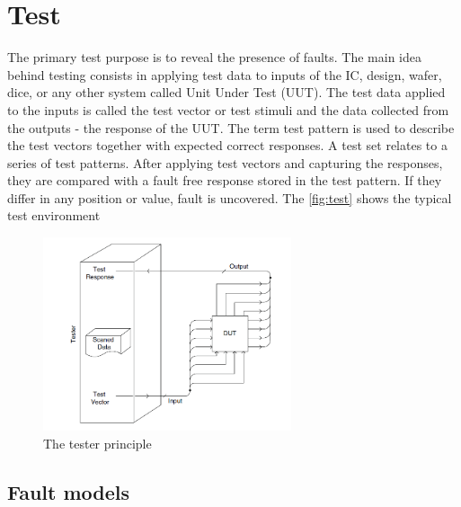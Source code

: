 \chapter{Test}
The primary test purpose is to reveal the presence of faults. The main idea behind testing consists in applying test data to inputs of the IC, design, wafer, dice, or any other system called Unit Under Test (UUT). The test data applied to the inputs is called the test vector or test stimuli and the data collected from the outputs - the response of the UUT. The term test pattern is used to describe the test vectors together with expected correct responses. A test set relates to a series of test patterns. After applying test vectors and capturing the responses, they are compared with a fault free response stored in the test pattern. If they differ in any position or value, fault is uncovered. The \autoref{fig:test} shows the typical test environment

\begin{figure}[H]
\centering
\includegraphics[width=0.65\textwidth]{figures/test.png}
\caption{The tester principle~\cite{book:Navabi}}
\label{fig:test}
\end{figure}


\section{Fault models}


